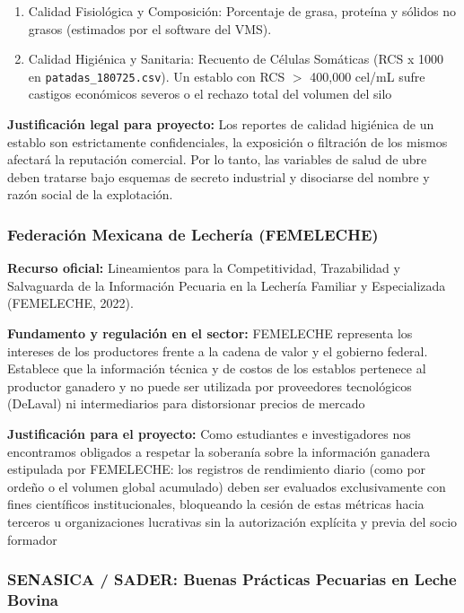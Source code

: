 \begin{enumerate}
  \item Calidad Fisiológica y Composición: Porcentaje de grasa, proteína y sólidos no grasos (estimados por el software del VMS).
  \item Calidad Higiénica y Sanitaria: Recuento de Células Somáticas (RCS x 1000 en \texttt{patadas\_180725.csv}). Un establo con RCS $>$ 400,000 cel/mL sufre castigos económicos severos o el rechazo total del volumen del silo
\end{enumerate}

\textbf{Justificación legal para proyecto:} Los reportes de calidad higiénica de un establo son estrictamente confidenciales, la exposición o filtración de los mismos afectará la reputación comercial. Por lo tanto, las variables de salud de ubre deben tratarse bajo esquemas de secreto industrial y disociarse del nombre y razón social de la explotación.

\subsubsection{Federación Mexicana de Lechería (FEMELECHE)}

\textbf{Recurso oficial:} Lineamientos para la Competitividad, Trazabilidad y Salvaguarda de la Información Pecuaria en la Lechería Familiar y Especializada (FEMELECHE, 2022).

\textbf{Fundamento y regulación en el sector:} FEMELECHE representa los intereses de los productores frente a la cadena de valor y el gobierno federal. Establece que la información técnica y de costos de los establos pertenece al productor ganadero y no puede ser utilizada por proveedores tecnológicos (DeLaval) ni intermediarios para distorsionar precios de mercado

\textbf{Justificación para el proyecto:} Como estudiantes e investigadores nos encontramos obligados a respetar la soberanía sobre la información ganadera estipulada por FEMELECHE: los registros de rendimiento diario (como por ordeño o el volumen global acumulado) deben ser evaluados exclusivamente con fines científicos institucionales, bloqueando la cesión de estas métricas hacia terceros u organizaciones lucrativas sin la autorización explícita y previa del socio formador

\subsubsection{SENASICA / SADER: Buenas Prácticas Pecuarias en Leche Bovina}

